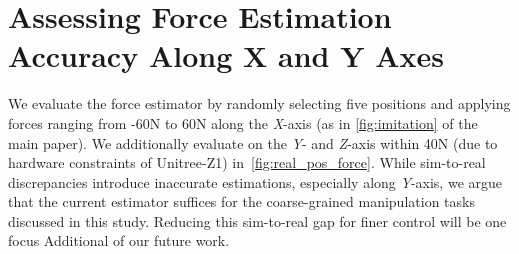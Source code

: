 \documentclass{article}
\begin{document}
\section{Assessing Force Estimation Accuracy Along X and Y Axes}
\label{sec:appendix:real_word_force_control_experiment}
We evaluate the force estimator by randomly selecting five positions and applying forces ranging from -60N to 60N along the \textit{X}-axis (as in \cref{fig:imitation} of the main paper). We additionally evaluate on the \textit{Y}- and \textit{Z}-axis within 40N (due to hardware constraints of Unitree-Z1) in~\cref{fig:real_pos_force}. While sim-to-real discrepancies introduce inaccurate estimations, especially along \textit{Y}-axis, we argue that the current estimator suffices for the coarse-grained manipulation tasks discussed in this study. Reducing this sim-to-real gap for finer control will be one focus Additional of our future work.
\end{document}

